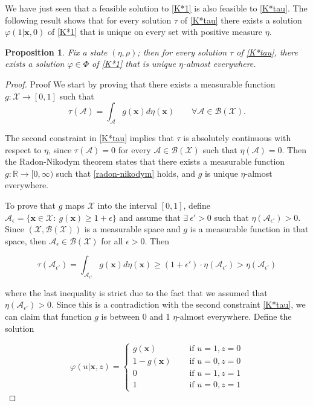 \documentclass[12pt,a4paper]{article}
\newtheorem{proposition}{Proposition}
\newcommand{\bx}{\mathbf{x}}
\newcommand{\mA}{\mathcal{A}}
\newcommand{\mX}{\mathcal{X}}
\newcommand{\mABX}{\mathcal{A} \in \mathcal{B}(\mathcal{X})}
\newcommand{\mBX}{ \mathcal{B}(\mathcal{X})}
\begin{document}
    
    
    
    We have just seen that a feasible solution to \eqref{K*1} is also feasible to \eqref{K*tau}. The following result shows that for every solution $\tau$ of \eqref{K*tau} there exists a solution $\varphi(1|\bx,0)$ of \eqref{K*1} that is unique on every set with positive measure $\eta$.
	
	\begin{proposition}\label{lemma:phi}
		Fix a state $(\eta,\rho)$; then for every solution $\tau$ of \eqref{K*tau}, there exists a solution $\varphi \in \Phi$ of \eqref{K*1} that is unique $\eta$-almost everywhere.
	\end{proposition}
	
	\begin{proof}{Proof}
		We start by proving that there exists a measurable function $g: \mathcal{X} \rightarrow [0,1]$ such that
		\begin{equation} \label{radon-nikodym}
			\tau(\mA)=\int_{\mA} g(\bx) d\eta(\bx) \qquad \forall \mABX.
		\end{equation}
		
		The second constraint in \eqref{K*tau} implies that $\tau$ is absolutely continuous with respect to $\eta$, since $\tau(\mA)=0$ for every $\mABX$ such that $\eta(\mA)=0$. Then the Radon-Nikodym theorem states that there exists a measurable function $g: \mathbb{R} \rightarrow [0,\infty)$ such that \eqref{radon-nikodym} holds, and $g$ is unique $\eta$-almost everywhere. 
		
		
		To prove that $g$ maps $\mX$ into the interval $[0,1]$, define $\mA_\epsilon=\{ \bx \in \mX: \ g(\bx)\geq 1+\epsilon \}$ and assume that $\exists \ \epsilon'>0$ such that $\eta(\mA_{\epsilon'})>0$. Since $(\mX,\mBX)$ is a measurable space and $g$ is a measurable function in that space, then $\mA_\epsilon \in \mBX$ for all $\epsilon>0$. Then
		
		$$\tau(\mA_{\epsilon'})=\int_{\mA_{\epsilon'}} g(\bx) d\eta(\bx) \geq (1+ \epsilon') \cdot \eta(\mA_{\epsilon'}) > \eta(\mA_{\epsilon'}) $$
		
		\noindent where the last inequality is strict due to the fact that we assumed that $\eta(\mA_{\epsilon'})>0$. Since this is a contradiction with the second constraint \eqref{K*tau}, we can claim that function $g$ is between 0 and 1 $\eta$-almost everywhere. Define the solution 
		
		$$
		\varphi(u|\bx,z)=\left\{ 
		\begin{array}{ll}
			g(\bx) & \quad \mbox{ if } u=1,z=0\\
			1-g(\bx) & \quad \mbox{ if } u=0,z=0\\
			0 & \quad \mbox{ if } u=1,z=1\\
			1 & \quad \mbox{ if } u=0,z=1
		\end{array}
		\right.
		$$
		

\end{proof}
\end{document}
